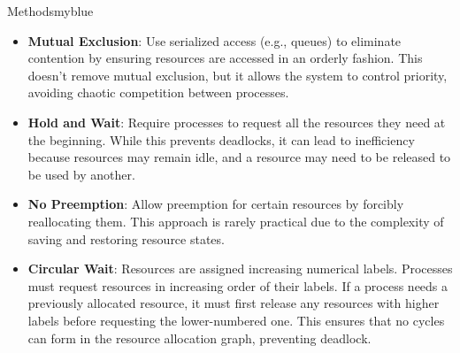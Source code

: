 \begin{prettyBox}{Methods}{myblue}
\begin{itemize}
\begin{itemize}
\item \textbf{Mutual Exclusion}: Use serialized access (e.g., queues) to eliminate contention by ensuring resources are accessed in an orderly fashion. This doesn't remove mutual exclusion, but it allows the system to control priority, avoiding chaotic competition between processes.
        \item \textbf{Hold and Wait}: Require processes to request all the resources they need at the beginning. 
        While this prevents deadlocks, it can lead to inefficiency because resources may remain idle, and a resource may need to be released to be used by another.
        \item \textbf{No Preemption}: Allow preemption for certain resources by forcibly reallocating them. This
            approach is rarely practical due to the complexity of saving and restoring resource states.
        \item \textbf{Circular Wait}: Resources are assigned increasing numerical labels. Processes must request 
    resources in increasing order of their labels. If a process needs a previously allocated resource, it must first
    release any resources with higher labels before requesting the lower-numbered one. This ensures that no cycles can form in the resource allocation graph, preventing deadlock.
    \end{itemize}
\end{itemize}
\end{prettyBox}


